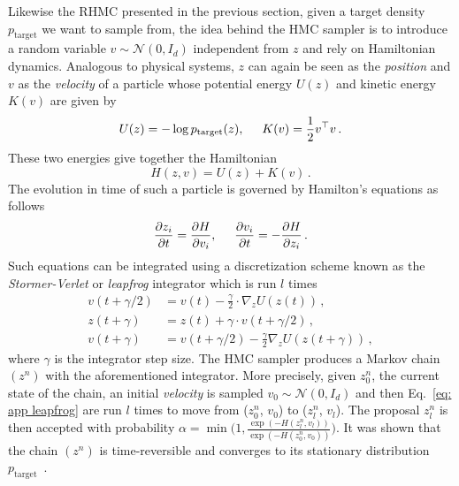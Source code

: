 \documentclass[10pt,journal,compsoc]{IEEEtran}
\begin{document}
Likewise the RHMC presented in the previous section, given a target density $p_{\mathrm{target}}$ we want to sample from, the idea behind the HMC sampler is to introduce a random variable $v \sim \mathcal{N}(0,I_d)$ independent from $z$ and rely on Hamiltonian dynamics. Analogous to physical systems, $z$ can again be seen as the \emph{position} and $v$ as the \emph{velocity} of a particle whose potential energy $U(z)$ and kinetic energy $K(v)$ are given by 
    \begin{equation*}
      U(z) = - \log p_{\mathrm{target}}(z), \hspace{5mm} K(v)= \frac{1}{2} v^{\top} v\,.
    \end{equation*}
    These two energies give together the Hamiltonian \cite{duane_hybrid_1987,leimkuhler_simulating_2004}
    \begin{equation*}
      H(z, v) = U(z) + K(v)\,.
    \end{equation*}
    The evolution in time of such a particle is governed by Hamilton's equations as follows
    \[
        \frac{\partial z_i}{\partial t} = \frac{\partial H}{\partial v_i}, \hspace{5mm}
        \frac{\partial v_i}{\partial t} = - \frac{\partial H}{\partial z_i} \,. 
    \]
    Such equations can be integrated using a discretization scheme known as the \emph{Stormer-Verlet} or \emph{leapfrog} integrator which is run $l$ times
    \begin{equation}
      \begin{aligned}\label{eq: app leapfrog}
          v(t + \gamma/2) &= v(t) - \frac{\gamma}{2} \cdot \nabla_z U(z(t))\,,\\
          z(t + \gamma) &= z(t) + \gamma \cdot v(t + \gamma/2)\,,\\
          v(t + \gamma) &= v(t + \gamma/2) - \frac{\gamma}{2} \nabla_z U(z(t + \gamma))\,,
      \end{aligned}
  \end{equation}
  where $\gamma$ is the integrator step size. The HMC sampler produces a Markov chain $(z^n)$ with the aforementioned integrator. More precisely, given $z_0^n$, the current state of the chain, an initial \emph{velocity} is sampled $v_0 \sim \mathcal{N}(0, I_d)$ and then Eq.~\eqref{eq: app leapfrog} are run $l$ times to move from ($z_0^n$, $v_0$) to ($z_l^n$, $v_l$). The proposal $z_l^n$ is then accepted with probability $\alpha = \min\Big(1, \frac{\exp (-H(z_l^n, v_l))}{\exp (-H(z_0^n, v_0))}\Big)$. It was shown that the chain $(z^n)$ is time-reversible and converges to its stationary distribution $p_{\mathrm{target}}$~\cite{duane_hybrid_1987,liu_monte_2008,neal_mcmc_2011}. 
  
\end{document}
